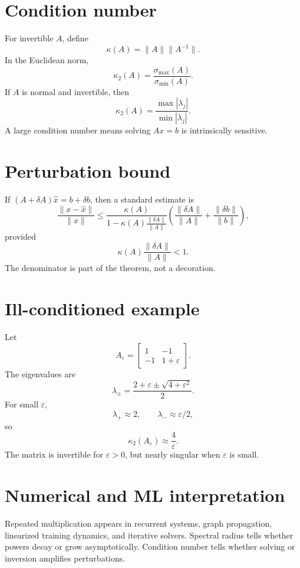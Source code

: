 \section{Condition number}

For invertible \(A\), define
\[
  \kappa(A)=\|A\|\|A^{-1}\|.
\]
In the Euclidean norm,
\[
  \kappa_2(A)=\frac{\sigma_{\max}(A)}{\sigma_{\min}(A)}.
\]
If \(A\) is normal and invertible, then
\[
  \kappa_2(A)=\frac{\max |\lambda_j|}{\min |\lambda_j|}.
\]
A large condition number means solving \(Ax=b\) is intrinsically sensitive.

\section{Perturbation bound}

If \((A+\delta A)\widehat x=b+\delta b\), then a standard estimate is
\[
  \frac{\|x-\widehat x\|}{\|x\|}
  \le
  \frac{\kappa(A)}{1-\kappa(A)\frac{\|\delta A\|}{\|A\|}}
  \left(
  \frac{\|\delta A\|}{\|A\|}+\frac{\|\delta b\|}{\|b\|}
  \right),
\]
provided
\[
  \kappa(A)\frac{\|\delta A\|}{\|A\|}<1.
\]
The denominator is part of the theorem, not a decoration.

\section{Ill-conditioned example}

Let
\[
  A_\varepsilon=\begin{bmatrix}1&-1\\-1&1+\varepsilon\end{bmatrix}.
\]
The eigenvalues are
\[
  \lambda_\pm=\frac{2+\varepsilon\pm\sqrt{4+\varepsilon^2}}{2}.
\]
For small \(\varepsilon\),
\[
  \lambda_+\approx2,\qquad \lambda_-\approx\varepsilon/2,
\]
so
\[
  \kappa_2(A_\varepsilon)\approx \frac4\varepsilon.
\]
The matrix is invertible for \(\varepsilon>0\), but nearly singular when \(\varepsilon\) is small.

\section{Numerical and ML interpretation}

Repeated multiplication appears in recurrent systems, graph propagation, linearized training dynamics, and iterative solvers.  Spectral radius tells whether powers decay or grow asymptotically.  Condition number tells whether solving or inversion amplifies perturbations.

